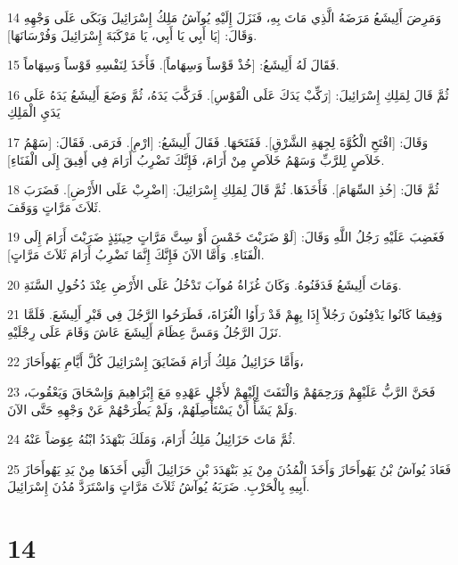 \par 14 وَمَرِضَ أَلِيشَعُ مَرَضَهُ الَّذِي مَاتَ بِهِ، فَنَزَلَ إِلَيْهِ يُوآشُ مَلِكُ إِسْرَائِيلَ وَبَكَى عَلَى وَجْهِهِ وَقَالَ: [يَا أَبِي يَا أَبِي، يَا مَرْكَبَةَ إِسْرَائِيلَ وَفُرْسَانَهَا].
\par 15 فَقَالَ لَهُ أَلِيشَعُ: [خُذْ قَوْساً وَسِهَاماً]. فَأَخَذَ لِنَفْسِهِ قَوْساً وَسِهَاماً.
\par 16 ثُمَّ قَالَ لِمَلِكِ إِسْرَائِيلَ: [رَكِّبْ يَدَكَ عَلَى الْقَوْسِ]. فَرَكَّبَ يَدَهُ، ثُمَّ وَضَعَ أَلِيشَعُ يَدَهُ عَلَى يَدَيِ الْمَلِكِ
\par 17 وَقَالَ: [افْتَحِ الْكُوَّةَ لِجِهَةِ الشَّرْقِ]. فَفَتَحَهَا. فَقَالَ أَلِيشَعُ: [ارْمِ]. فَرَمَى. فَقَالَ: [سَهْمُ خَلاَصٍ لِلرَّبِّ وَسَهْمُ خَلاَصٍ مِنْ أَرَامَ، فَإِنَّكَ تَضْرِبُ أَرَامَ فِي أَفِيقَ إِلَى الْفَنَاءِ].
\par 18 ثُمَّ قَالَ: [خُذِ السِّهَامَ]. فَأَخَذَهَا. ثُمَّ قَالَ لِمَلِكِ إِسْرَائِيلَ: [اضْرِبْ عَلَى الأَرْضِ]. فَضَرَبَ ثَلاَثَ مَرَّاتٍ وَوَقَفَ.
\par 19 فَغَضِبَ عَلَيْهِ رَجُلُ اللَّهِ وَقَالَ: [لَوْ ضَرَبْتَ خَمْسَ أَوْ سِتَّ مَرَّاتٍ حِينَئِذٍ ضَرَبْتَ أَرَامَ إِلَى الْفَنَاءِ. وَأَمَّا الآنَ فَإِنَّكَ إِنَّمَا تَضْرِبُ أَرَامَ ثَلاَثَ مَرَّاتٍ].
\par 20 وَمَاتَ أَلِيشَعُ فَدَفَنُوهُ. وَكَانَ غُزَاةُ مُوآبَ تَدْخُلُ عَلَى الأَرْضِ عِنْدَ دُخُولِ السَّنَةِ.
\par 21 وَفِيمَا كَانُوا يَدْفِنُونَ رَجُلاً إِذَا بِهِمْ قَدْ رَأَوُا الْغُزَاةَ، فَطَرَحُوا الرَّجُلَ فِي قَبْرِ أَلِيشَعَ. فَلَمَّا نَزَلَ الرَّجُلُ وَمَسَّ عِظَامَ أَلِيشَعَ عَاشَ وَقَامَ عَلَى رِجْلَيْهِ.
\par 22 وَأَمَّا حَزَائِيلُ مَلِكُ أَرَامَ فَضَايَقَ إِسْرَائِيلَ كُلَّ أَيَّامِ يَهُوأَحَازَ،
\par 23 فَحَنَّ الرَّبُّ عَلَيْهِمْ وَرَحِمَهُمْ وَالْتَفَتَ إِلَيْهِمْ لأَجْلِ عَهْدِهِ مَعَ إِبْرَاهِيمَ وَإِسْحَاقَ وَيَعْقُوبَ، وَلَمْ يَشَأْ أَنْ يَسْتَأْصِلَهُمْ، وَلَمْ يَطْرَحْهُمْ عَنْ وَجْهِهِ حَتَّى الآنَ.
\par 24 ثُمَّ مَاتَ حَزَائِيلُ مَلِكُ أَرَامَ، وَمَلَكَ بَنْهَدَدُ ابْنُهُ عِوَضاً عَنْهُ.
\par 25 فَعَادَ يُوآشُ بْنُ يَهُوأَحَازَ وَأَخَذَ الْمُدُنَ مِنْ يَدِ بَنْهَدَدَ بْنِ حَزَائِيلَ الَّتِي أَخَذَهَا مِنْ يَدِ يَهُوأَحَازَ أَبِيهِ بِالْحَرْبِ. ضَرَبَهُ يُوآشُ ثَلاَثَ مَرَّاتٍ وَاسْتَرَدَّ مُدُنَ إِسْرَائِيلَ.

\chapter{14}

